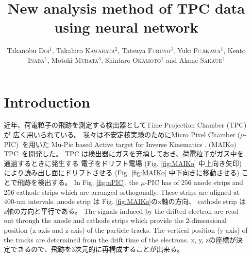 \documentclass{jps-cp}
\title{New analysis method of TPC data using neural network}
\author{
  Takanobu \textsc{Doi}$^{1}$, Takahiro \textsc{Kawabata}$^{2}$, Tatsuya \textsc{Furuno}$^{3}$,
  Yuki \textsc{Fujikawa}$^{1}$, Kento \textsc{Inaba}$^{1}$, Motoki \textsc{Murata}$^{3}$,
  Shintaro \textsc{Okamoto}$^{1}$ and Akane \textsc{Sakaue}$^{1}$}
\begin{document}
\maketitle

\section{Introduction}
近年、荷電粒子の飛跡を測定する検出器としてTime Projection Chamber (TPC) が
広く用いられている。
我々は不安定核実験のためにMicro Pixel Chamber ($\mu$-PIC)~\cite{mupic}を用いた
Mu-Pic based Active target for Inverse Kinematics . (MAIKo) TPC~\cite{MAIKo}を開発した。
TPC は検出器にガスを充填しておき、荷電粒子がガス中を通過するときに発生する
電子をドリフト電場 (Fig. \ref{fig:MAIKo} 中上向き矢印) により読み出し面にドリフトさせる
(Fig. \ref{fig:MAIKo} 中下向きに移動させる) ことで飛跡を検出する。
In Fig. \ref{fig:uPIC}, the $\mu$-PIC has of 256 anode strips and 256 cathode strips
which are arranged orthogonally.
These strips are aligned at 400-um intervals.
anode strip は Fig. \ref{fig:MAIKo}のx軸の方向、
cathode strip は z軸の方向と平行である。
The signals induced by the drifted electron are read out through the anode and 
cathode strips which provide the 2-dimensional position (x-axis and z-axis) 
of the particle tracks.
The vertical position (y-axis) of the tracks are determined 
from the drift time of the electrons.
x, y, zの座標が決定できるので、飛跡を3次元的に再構成することが出来る。
\end{document}
